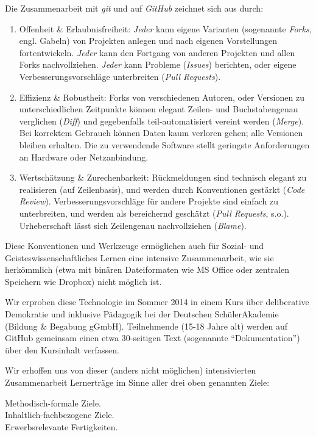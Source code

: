 \documentclass[11pt,a4paper,oneside]{article}
\begin{document}
Die Zusammenarbeit mit \emph{git} und auf \emph{GitHub} zeichnet sich aus durch:
\begin{enumerate}
	\item Offenheit & Erlaubnisfreiheit:
		\emph{Jeder} kann eigene Varianten (sogenannte \emph{Forks}, engl. Gabeln) von Projekten anlegen und nach eigenen Vorstellungen fortentwickeln.
		\emph{Jeder} kann den Fortgang von anderen Projekten und allen Forks nachvollziehen.
		\emph{Jeder} kann Probleme (\emph{Issues}) berichten, oder eigene Verbesserungsvorschläge unterbreiten (\emph{Pull Requests}).
	\item Effizienz & Robustheit:
		Forks von verschiedenen Autoren, oder Versionen zu unterschiedlichen Zeitpunkte können elegant Zeilen- und Buchstabengenau verglichen (\emph{Diff}) und gegebenfalls teil-automatisiert vereint werden (\emph{Merge}).
		Bei korrektem Gebrauch können Daten kaum verloren gehen; alle Versionen bleiben erhalten.
		Die zu verwendende Software stellt geringste Anforderungen an Hardware oder Netzanbindung.
	\item Wertschätzung & Zurechenbarkeit:
		Rückmeldungen sind technisch elegant zu realisieren (auf Zeilenbasis), und werden durch Konventionen gestärkt (\emph{Code Review}).
		Verbesserungsvorschläge für andere Projekte sind einfach zu unterbreiten, und werden als bereichernd geschätzt (\emph{Pull Requests}, s.o.).
		Urheberschaft lässt sich Zeilengenau nachvollziehen (\emph{Blame}).
\end{enumerate}

Diese Konventionen und Werkzeuge ermöglichen auch für Sozial- und Geisteswissenschaftliches Lernen eine intensive Zusammenarbeit, wie sie herkömmlich (etwa mit binären Dateiformaten wie MS Office oder zentralen Speichern wie Dropbox) nicht möglich ist.

Wir erproben diese Technologie im Sommer 2014 in einem Kurs über deliberative Demokratie und inklusive Pädagogik bei der Deutschen SchülerAkademie (Bildung & Begabung gGmbH).
Teilnehmende (15-18 Jahre alt) werden auf GitHub gemeinsam einen etwa 30-seitigen Text (sogenannte ``Dokumentation'') über den Kursinhalt verfassen.

Wir erhoffen uns von dieser (anders nicht möglichen) intensivierten Zusammenarbeit Lernerträge im Sinne aller drei oben genannten Ziele:
\begin{description}
	\item[Methodisch-formale Ziele.]
	\item[Inhaltlich-fachbezogene Ziele.]
	\item[Erwerbsrelevante Fertigkeiten.]
\end{description}
\end{document}

